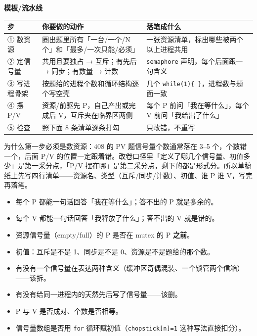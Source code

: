 \documentclass[10pt,a4paper]{ctexart}
\begin{document}

\textbf{模板/流水线}

\begin{center}\small
\begin{tabularx}{\linewidth}{@{}l>{\raggedright\arraybackslash}X>{\raggedright\arraybackslash}X@{}}
\toprule
步 & 你要做的动作 & 落笔成什么 \\
\midrule
① 数资源 & 圈出题里所有「一台/一个/N 个」和「最多/一次只能/必须」 & 一张资源清单，标出哪些被两个以上进程共用 \\
② 定信号量 & 共用且要独占 → 互斥；有先后 → 同步；有数量 → 计数 & \texttt{semaphore} 声明，每个后面跟一句含义 \\
③ 写进程骨架 & 按题给的进程个数和循环结构逐个写空壳 & 几个 \texttt{while(1)\{ \}}，进程数与题面一致 \\
④ 摆 P/V & 资源/前驱先 P，自己产出或完成后 V，互斥夹在临界区两侧 & 每个 P 前问「我在等什么」，每个 V 前问「我给出了什么」 \\
⑤ 检查 & 照下面 8 条清单逐条打勾 & 只改错，不重写 \\
\bottomrule
\end{tabularx}
\end{center}

为什么第一步必须是数资源：408 的 PV 题信号量个数通常落在 3–5 个，个数错一个，后面 P/V 的位置一定跟着错。改卷口径里「定义了哪几个信号量、初值多少」是第一采分点，「P/V 摆在哪」是第二采分点，剩下的都是形式分。所以草稿纸上先写四行清单——资源名、类型（互斥/同步/计数）、初值、谁 P 谁 V，写完再落笔。


\begin{itemize}

\item 每个 P 都能一句话回答「我在等什么」；答不出的 P 就是多余的。

\item 每个 V 都能一句话回答「我释放了什么」；答不出的 V 就是错的。

\item 资源信号量（empty/full）的 P 是否在 mutex 的 P \textbf{之前}。

\item 初值：互斥是不是 1、同步是不是 0、资源是不是题给的那个数。

\item 有没有一个信号量在表达两种含义（缓冲区奇偶混装、一个锁管两个信箱）——该拆。

\item 有没有给同一进程内的天然先后写了信号量——该删。

\item P 与 V 是否成对、个数是否相等。

\item 信号量数组是否用 \texttt{for} 循环赋初值（\texttt{chopstick[n]=1} 这种写法直接扣分）。

\end{itemize}
\end{document}
